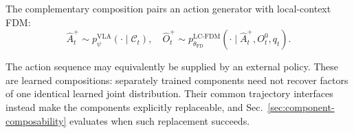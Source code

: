 The complementary composition pairs an action generator with local-context FDM:
\begin{equation}
\hat{A}_t^+ \sim p_\psi^{\mathrm{VLA}}(\cdot\mid\mathcal C_t),
\quad
\hat{O}_t^+ \sim p_{\theta_{\mathrm{FD}}}^{\mathrm{LC\text{-}FDM}}
(\cdot\mid \hat{A}_t^+, O_t^0, q_t).
\label{eq:strict-atv-composition}
\end{equation}

The action sequence may equivalently be supplied by an external policy.
These are learned compositions: separately trained components need not
recover factors of one identical learned joint distribution. Their common
trajectory interfaces instead make the components explicitly replaceable,
and Sec.~\ref{sec:component-composability} evaluates when such replacement
succeeds.
